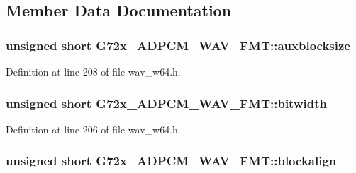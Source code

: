 \subsection{Member Data Documentation}
\subsubsection[{\texorpdfstring{auxblocksize}{auxblocksize}}]{\setlength{\rightskip}{0pt plus 5cm}unsigned short G72x\+\_\+\+A\+D\+P\+C\+M\+\_\+\+W\+A\+V\+\_\+\+F\+M\+T\+::auxblocksize}\hypertarget{struct_g72x___a_d_p_c_m___w_a_v___f_m_t_a1adcee5a5a4854c92317665aa4ce7554}{}\label{struct_g72x___a_d_p_c_m___w_a_v___f_m_t_a1adcee5a5a4854c92317665aa4ce7554}


Definition at line 208 of file wav\+\_\+w64.\+h.

\subsubsection[{\texorpdfstring{bitwidth}{bitwidth}}]{\setlength{\rightskip}{0pt plus 5cm}unsigned short G72x\+\_\+\+A\+D\+P\+C\+M\+\_\+\+W\+A\+V\+\_\+\+F\+M\+T\+::bitwidth}\hypertarget{struct_g72x___a_d_p_c_m___w_a_v___f_m_t_ad84c811a3263e7ec83f19b337f117eb4}{}\label{struct_g72x___a_d_p_c_m___w_a_v___f_m_t_ad84c811a3263e7ec83f19b337f117eb4}


Definition at line 206 of file wav\+\_\+w64.\+h.

\subsubsection[{\texorpdfstring{blockalign}{blockalign}}]{\setlength{\rightskip}{0pt plus 5cm}unsigned short G72x\+\_\+\+A\+D\+P\+C\+M\+\_\+\+W\+A\+V\+\_\+\+F\+M\+T\+::blockalign}\hypertarget{struct_g72x___a_d_p_c_m___w_a_v___f_m_t_ab7f5a2e60e7aa6a2f869181d5784b831}{}\label{struct_g72x___a_d_p_c_m___w_a_v___f_m_t_ab7f5a2e60e7aa6a2f869181d5784b831}


